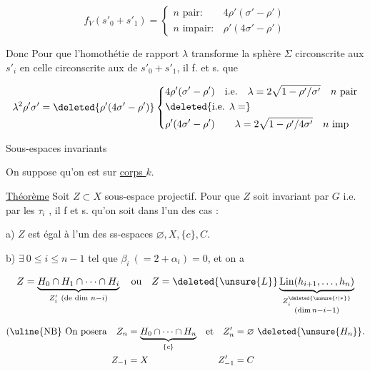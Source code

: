 \[
f_V(s'_0+s'_1)=\begin{cases}
n\text{ pair}:&4\rho'(\sigma'-\rho')\\
n\text{ impair}:&\rho'(4\sigma'-\rho')
\end{cases}
\]

Donc Pour que l'homothétie de rapport $\lambda$ transforme la sphère $\Sigma$ circonscrite aux $s'_i$ en celle circonscrite aux  de $s'_0+s'_1$, il f. et s. que

\[
\lambda^2\rho'\sigma'=\deleted{\rho'(4\sigma'-\rho')}
\left\{\begin{aligned}
&4\rho'(\sigma'-\rho')\quad\text{i.e.}\quad
\lambda=2\sqrt{1-\rho'/\sigma'}\quad n\text{ pair}\\
&\deleted{\text{i.e. }\lambda=}\\
&\rho'(4\sigma'-\rho')\qquad\lambda=2\sqrt{1-\rho'/4\sigma'}\quad n\text{ imp}
\end{aligned}\right.
\]

Sous-espaces invariants

On suppose qu'on est sur \uline{corps $k$}.

\uline{Théorème} Soit $Z\subset X$ sous-espace projectif.  Pour que $Z$ soit invariant par $G$ i.e. par les $\tau_i$ , il f et s. qu'on soit dans l'un des cas  :

a) $Z$ est égal à l'un des ss-espaces $\varnothing,X,\{c\},C$.

b) $\exists\ 0\le i\le n-1$ tel que $\beta_i\ (=2+\alpha_i)=0$, et on a

\[
Z=\underbrace{H_0\cap H_1\cap\cdots\cap H_i}_{Z'_i\ (\text{de dim }n-i)}
\quad\text{ou}\quad
Z=\deleted{\unsure{L}}\underbrace{\mathrm{Lin}(h_{i+1},\ldots,h_n)}_
 {\substack{Z_i^{\deleted{\unsure{\prime|*}}}\\(\dim n-i-1)}}
\]



\[
\begin{aligned}
(\text{\uline{NB} On posera}\quad Z_n&=\underbrace{H_0\cap\cdots\cap H_n}_{\{c\}}
 &\text{et}\quad Z'_n&=\varnothing\ \deleted{\unsure{H_n}}.\\
 Z_{-1}&=X &Z'_{-1}&=C
\end{aligned}
\]

